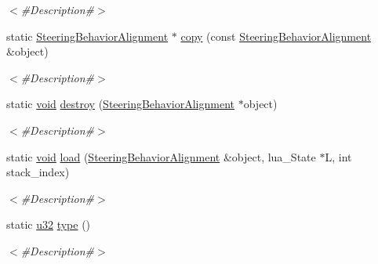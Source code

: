 \begin{DoxyCompactItemize}
\begin{DoxyCompactList}\small\item\em $<$\#\+Description\#$>$ \end{DoxyCompactList}\item 
static \mbox{\hyperlink{classnjli_1_1_steering_behavior_alignment}{Steering\+Behavior\+Alignment}} $\ast$ \mbox{\hyperlink{classnjli_1_1_steering_behavior_alignment_a3fd6800a40920454a794a1ac4e81ca5d}{copy}} (const \mbox{\hyperlink{classnjli_1_1_steering_behavior_alignment}{Steering\+Behavior\+Alignment}} \&object)
\begin{DoxyCompactList}\small\item\em $<$\#\+Description\#$>$ \end{DoxyCompactList}\item 
static \mbox{\hyperlink{_thread_8h_af1e856da2e658414cb2456cb6f7ebc66}{void}} \mbox{\hyperlink{classnjli_1_1_steering_behavior_alignment_a4d6922da07d5042beb9d9130939ca412}{destroy}} (\mbox{\hyperlink{classnjli_1_1_steering_behavior_alignment}{Steering\+Behavior\+Alignment}} $\ast$object)
\begin{DoxyCompactList}\small\item\em $<$\#\+Description\#$>$ \end{DoxyCompactList}\item 
static \mbox{\hyperlink{_thread_8h_af1e856da2e658414cb2456cb6f7ebc66}{void}} \mbox{\hyperlink{classnjli_1_1_steering_behavior_alignment_a23b61442bc50667c336289af4c212f3a}{load}} (\mbox{\hyperlink{classnjli_1_1_steering_behavior_alignment}{Steering\+Behavior\+Alignment}} \&object, lua\+\_\+\+State $\ast$L, int stack\+\_\+index)
\begin{DoxyCompactList}\small\item\em $<$\#\+Description\#$>$ \end{DoxyCompactList}\item 
static \mbox{\hyperlink{_util_8h_a10e94b422ef0c20dcdec20d31a1f5049}{u32}} \mbox{\hyperlink{classnjli_1_1_steering_behavior_alignment_acad2dfa2c57e80058ac1916e5adda54e}{type}} ()
\begin{DoxyCompactList}\small\item\em $<$\#\+Description\#$>$ \end{DoxyCompactList}\end{DoxyCompactItemize}
